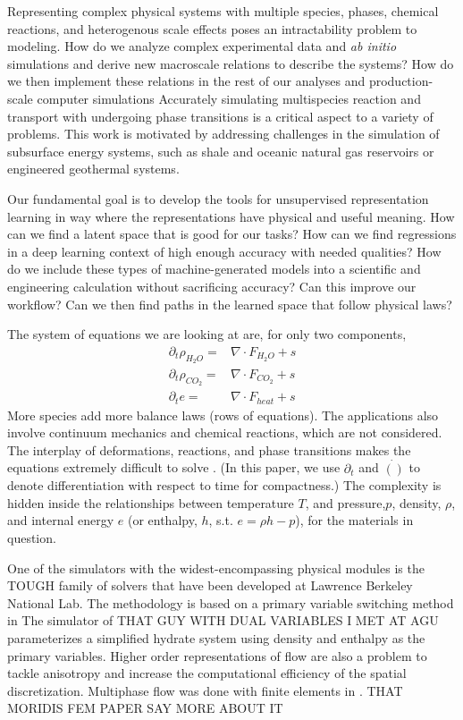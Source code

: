 \documentclass[]{article}
\begin{document}
Representing complex physical systems with multiple species, phases,
chemical reactions, and heterogenous scale effects poses an
intractability problem to modeling. How do we analyze complex
experimental data and \emph{ab initio} simulations and derive new
macroscale relations to describe the systems? How do we then implement
these relations in the rest of our analyses and production-scale
computer simulations
Accurately simulating multispecies reaction and transport with
undergoing phase transitions is a critical aspect to a variety of
problems.
This work is motivated by addressing challenges in the simulation of subsurface energy systems, such as shale
and oceanic natural gas reservoirs or engineered geothermal
systems.

Our fundamental goal is to develop the tools
for unsupervised representation learning in way where the
representations have physical and useful meaning.
How can we find a latent space that is good for our tasks?
How can we find regressions in a deep learning context of high enough
accuracy with needed qualities?
How do we include these types of machine-generated models into a
scientific and engineering calculation without sacrificing accuracy?
Can this improve our workflow?
Can we then find paths in the learned space that follow physical laws?


The system of equations we are looking at are, for only two components,
\begin{align}
  \partial_t \rho_{H_2O} =& \nabla \cdot F_{H_2O} + s \\
  \partial_t \rho_{CO_2} =& \nabla \cdot F_{CO_2} + s \\
  \partial_t e =& \nabla \cdot F_{heat} + s
\end{align}
More species add more balance laws (rows of equations). The applications also involve continuum
mechanics and chemical reactions, which are not considered. The interplay of deformations,
reactions, and phase transitions makes the equations extremely difficult
to solve \cite{queiruga_simulation_2019}. 
(In this paper, we use $\partial_t$
and $\dot{()}$ to denote differentiation with respect to time
for compactness.)
The complexity is hidden inside the relationships between temperature
$T$, and pressure,$p$, density, $\rho$, and internal energy $e$ (or
enthalpy, $h$, s.t. $e=\rho h - p$), 
for the materials in question.

One of the simulators with the widest-encompassing physical modules is
the TOUGH family of solvers that have been developed at Lawrence
Berkeley National Lab.
The methodology is based on a primary variable switching method in 
The simulator of THAT GUY WITH DUAL VARIABLES I MET AT AGU
parameterizes a simplified hydrate system using density and enthalpy
as the primary variables.
Higher order representations of flow are also a problem to tackle
anisotropy and increase the computational efficiency of the spatial
discretization\cite{hannon_enhanced_2018}. 
Multiphase flow was done with finite elements in \cite{yang_fully_2014}.
THAT MORIDIS FEM PAPER SAY MORE ABOUT IT
\end{document}
